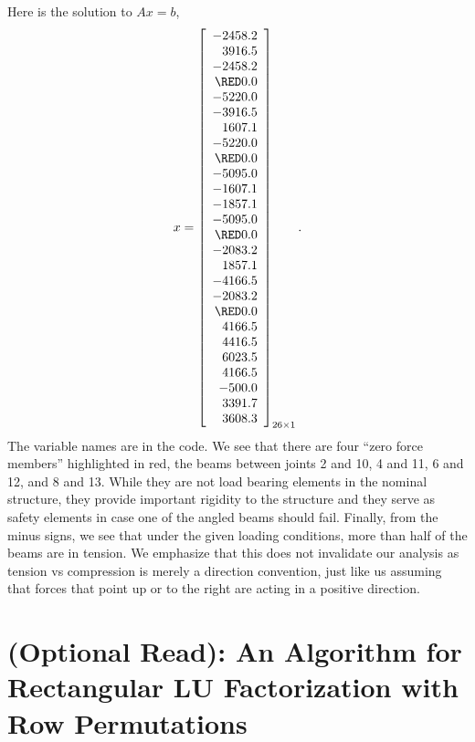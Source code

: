 \vspace*{.2cm}
Here is the solution to $Ax=b$,
\begin{equation}
x=\left[
\begin{array}{r}
-2458.2 \\
3916.5 \\
-2458.2 \\
\RED 0.0 \\
-5220.0 \\
-3916.5 \\
1607.1 \\
-5220.0 \\
\RED 0.0 \\
-5095.0 \\
-1607.1 \\
-1857.1 \\
-5095.0 \\
\RED 0.0 \\
-2083.2 \\
1857.1 \\
-4166.5 \\
-2083.2 \\
\RED 0.0 \\
4166.5 \\
4416.5 \\
6023.5 \\
4166.5 \\
-500.0 \\
3391.7 \\
3608.3 \\
\end{array}
\right]_{26 \times 1}.
\end{equation}
The variable names are in the code. We see that there are four ``zero force members'' highlighted in red, the beams between joints 2 and 10, 4 and 11, 6 and 12, and 8 and 13. While they are not load bearing elements in the nominal structure, they provide important rigidity to the structure and they serve as safety elements in case one of the angled beams should fail. Finally, from the minus signs, we see that under the given loading conditions, more than half of the beams are in tension. We emphasize that this does not invalidate our analysis as tension vs compression is merely a direction convention, just like us assuming that forces that point up or to the right are acting in a positive direction. 
\newpage

\section{(Optional Read): An Algorithm for Rectangular LU Factorization with Row Permutations}

